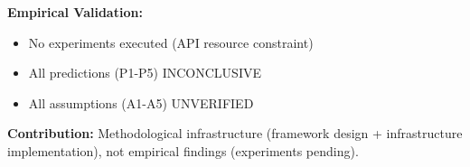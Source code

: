 \textbf{Empirical Validation:}
\begin{itemize}
\item No experiments executed (API resource constraint)
\item All predictions (P1-P5) INCONCLUSIVE
\item All assumptions (A1-A5) UNVERIFIED
\end{itemize}

\textbf{Contribution:} Methodological infrastructure (framework design + infrastructure implementation), not empirical findings (experiments pending).
